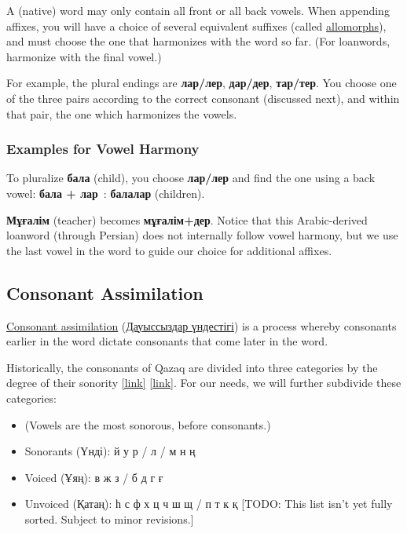 \documentclass[main.tex]{subfiles}
\begin{document}
A (native) word may only contain all front or all back vowels. When appending affixes, you will have a choice of several equivalent suffixes (called \href{https://en.wikipedia.org/wiki/Morpheme#Allomorphs}{allomorphs}), and must choose the one that harmonizes with the word so far. (For loanwords, harmonize with the final vowel.)

For example, the plural endings are \textbf{лар/лер}, \textbf{дар/дер}, \textbf{тар/тер}. You choose one of the three pairs according to the correct consonant (discussed next), and within that pair, the one which harmonizes the vowels.

\subsubsection*{Examples for Vowel Harmony}
To pluralize \textbf{бала} (child), you choose \textbf{лар/лер} and find the one using a back vowel:  \textbf{бала + лар} : \textbf{балалар} (children).

\textbf{Мұғалім} (teacher) becomes \textbf{мұғалім+дер}. Notice that this Arabic-derived loanword (through Persian) does not internally follow vowel harmony, but we use the last vowel in the word to guide our choice for additional affixes.

\subsection{Consonant Assimilation}
\href{https://en.wikipedia.org/wiki/Consonant_harmony}{Consonant assimilation} (\href{https://kk.wikipedia.org/wiki/\%D0\%94\%D0\%B0\%D1\%83\%D1\%8B\%D1\%81\%D1\%81\%D1\%8B\%D0\%B7\%D0\%B4\%D0\%B0\%D1\%80_\%D2\%AF\%D0\%BD\%D0\%B4\%D0\%B5\%D1\%81\%D1\%82\%D1\%96\%D0\%B3\%D1\%96}{Дауыссыздар үндестігі}) is a process whereby consonants earlier in the word dictate consonants that come later in the word.

Historically, the consonants of Qazaq are divided into three categories by the degree of their sonority  \href{https://oozcelik.pages.iu.edu/papers/Kazakh\%20phonology.pdf}{[link]} \href{https://itest.kz/kz/ent/qazaq-tili/fonetika/lecture/dauyssyz-dybystar-qatang-uyang-undi-dauyssyzdar-emlesi}{[link]}. For our needs, we will further subdivide these categories:
\begin{itemize}
	\item (Vowels are the most sonorous, before consonants.)
	\item Sonorants (Үнді): й у р / л / м н ң
	\item Voiced (Ұяң): в ж з / б д г ғ
	\item Unvoiced (Қатаң): һ с ф х ц ч ш щ / п т к қ [TODO: This list isn't yet fully sorted. Subject to minor revisions.]
\end{itemize}
\end{document}
